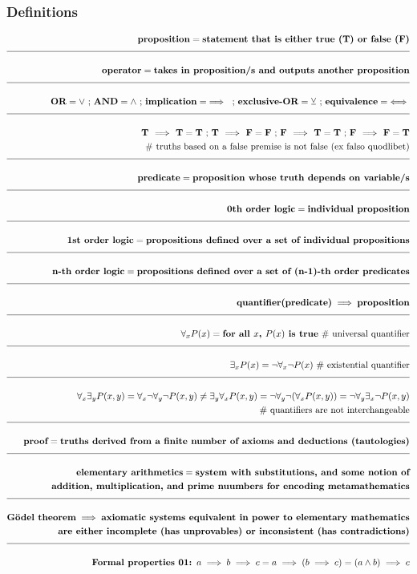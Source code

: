 \documentclass[a4paper]{article}
\newcommand{\eqComment}[1]{\text{  \# #1}}
\newcommand{\eqSep}{\text{ ;  }}
\newcommand{\n}{\\[1.5ex] \hline \nonumber \\[0ex]}
\newcommand{\m}{\nonumber \\}
\begin{document}
\subsubsection{Definitions}
\begin{tcolorbox}
\begin{align}
   \textbf{proposition} = \textbf{statement that is either true (T) or false (F)}
\n \textbf{operator} = \textbf{takes in proposition/s and outputs another proposition}
\n \textbf{OR} = \lor \eqSep \textbf{AND} = \land \eqSep \textbf{implication} = \implies \eqSep \textbf{exclusive-OR} =  \veebar \eqSep \textbf{equivalence} = \iff
\n \textbf{T $\implies$ T} = \textbf{T} \eqSep \textbf{T $\implies$ F} = \textbf{F} \eqSep \textbf{F $\implies$ T} = \textbf{T} \eqSep \textbf{F $\implies$ F} = \textbf{T} 
\m \eqComment{truths based on a false premise is not false (ex falso quodlibet)}
\n \textbf{predicate} = \textbf{proposition whose truth depends on variable/s}
\n \textbf{0th order logic} = \textbf{individual proposition}
\n \textbf{1st order logic} = \textbf{propositions defined over a set of individual propositions}
\n \textbf{n-th order logic} = \textbf{propositions defined over a set of (n-1)-th order predicates}
\n \textbf{quantifier(predicate)} \implies \textbf{proposition}
\n \forall_x P(x) = \textbf{for all $x$, $P(x)$ is true} \eqComment{universal quantifier}
\n \exists_x P(x) = \lnot \forall_x \lnot P(x) \eqComment{existential quantifier}
\n \forall_x \exists_y P(x, y) = \forall_x \lnot \forall_y \lnot P(x, y) \neq \exists_y \forall_x P(x, y) = \lnot \forall_y \lnot (\forall_x P(x, y)) = \lnot \forall_y \exists_x \lnot P(x, y)
\m \eqComment{quantifiers are not interchangeable}
\n \textbf{proof} = \textbf{truths derived from a finite number of axioms and deductions (tautologies)}
\n \textbf{elementary arithmetics} = \textbf{system with substitutions, and some notion of}
\m \textbf{addition, multiplication, and prime nuumbers for encoding metamathematics}
\n \textbf{G\"odel theorem} \implies \textbf{axiomatic systems equivalent in power to elementary mathematics}
\m \textbf{are either incomplete (has unprovables) or inconsistent (has contradictions)}
\n \textbf{Formal properties 01: } a \implies b \implies c = a \implies (b \implies c) = (a \land b) \implies c
\end{align}
\end{tcolorbox}
\end{document}
